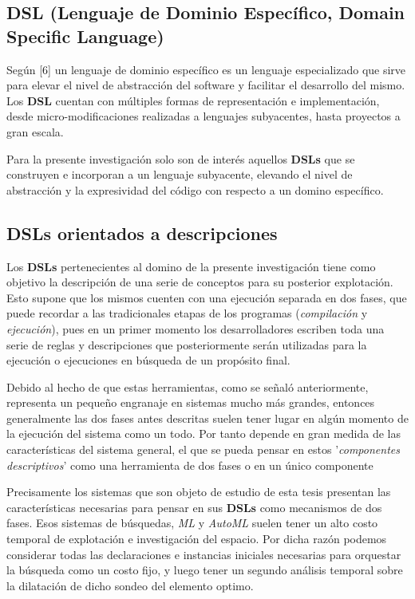\subsection{DSL (Lenguaje de Dominio Específico, Domain Specific Language)}

Según [6] un lenguaje de dominio específico es un lenguaje especializado que sirve
para elevar el nivel de abstracción del software y facilitar el desarrollo del mismo.
Los {\bf DSL} cuentan con múltiples formas de representación e implementación, desde
micro-modificaciones realizadas a lenguajes subyacentes, hasta proyectos a gran escala.

Para la presente investigación solo son de interés aquellos {\bf DSLs} que se construyen e
incorporan a un lenguaje subyacente, elevando el nivel de abstracción y la expresividad
del código con respecto a un domino específico.

\subsection{DSLs orientados a descripciones}

Los {\bf DSLs} pertenecientes al domino de la presente investigación tiene como objetivo
la descripción de una serie de conceptos para su posterior explotación. Esto supone que
los mismos cuenten con una ejecución separada en dos fases, que puede recordar a las
tradicionales etapas de los programas ({\it compilación} y {\it ejecución}), pues en un
primer momento los desarrolladores escriben toda una serie de reglas y descripciones
que posteriormente serán utilizadas para la ejecución o ejecuciones en búsqueda de un
propósito final.

Debido al hecho de que estas herramientas, como se señaló anteriormente, representa un
pequeño engranaje en sistemas mucho más grandes, entonces generalmente las dos fases
antes descritas suelen tener lugar en algún momento de la ejecución del sistema como un
todo. Por tanto depende en gran medida de las características del sistema general, el
que se pueda pensar en estos '{\it componentes descriptivos}' como una herramienta de dos
fases o en un único componente

Precisamente los sistemas que son objeto de estudio de esta tesis presentan las
características necesarias para pensar en sus {\bf DSLs} como mecanismos de dos fases.
Esos sistemas de búsquedas, {\it ML} y {\it AutoML} suelen tener un alto costo temporal de
explotación e investigación del espacio. Por dicha razón podemos considerar todas las
declaraciones e instancias iniciales necesarias para orquestar la búsqueda como un
costo fijo, y luego tener un segundo análisis temporal sobre la dilatación de dicho
sondeo del elemento optimo.

